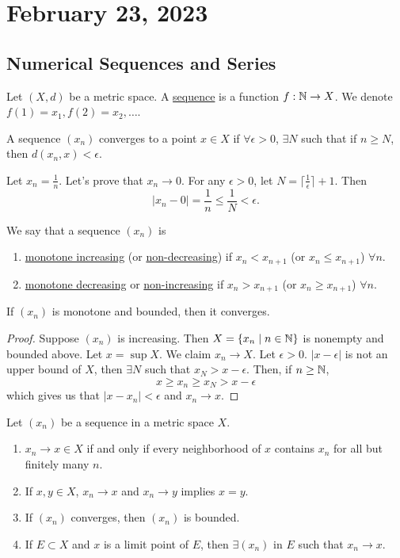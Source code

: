 \section{February 23, 2023}
\subsection{Numerical Sequences and Series}
\begin{definition}[Sequence]
    Let $(X, d)$ be a metric space. A \ul{sequence} is a function $f:\mathbb N\to X$. We denote $f(1) = x_1, f(2) = x_2, \dots$.
\end{definition}
\begin{definition}[Convergence]
    A sequence $(x_n)$ converges to a point $x\in X$ if $\forall \epsilon > 0$, $\exists N$ such that if $n\geq N$, then $d(x_n, x) < \epsilon$.
\end{definition}
\begin{example}
    Let $x_n = \frac{1}{n}$. Let's prove that $x_n\to 0$. For any $\epsilon > 0$, let $N = \lceil \frac{1}{\epsilon}\rceil + 1$. Then
    \[|x_n - 0| = \frac{1}{n}\leq \frac{1}{N} < \epsilon.\]
\end{example}
\begin{definition}
    We say that a sequence $(x_n)$ is
    \begin{enumerate}[(1)]
        \item \ul{monotone increasing} (or \ul{non-decreasing}) if $x_n < x_{n+1}$ (or $x_n \leq x_{n+1}$) $\forall n$.
        \item \ul{monotone decreasing} {or \ul{non-increasing}} if $x_n > x_{n+1}$ (or $x_n\geq x_{n+1}$) $\forall n$.
    \end{enumerate}
\end{definition}
\begin{theorem}
    If $(x_n)$ is monotone and bounded, then it converges.
\end{theorem}
\begin{proof}
    Suppose $(x_n)$ is increasing. Then $X = \left\{ x_n\mid n\in\mathbb N \right\}$ is nonempty and bounded above. Let $x = \sup X$. We claim $x_n\to X$. Let $\epsilon > 0$. $|x - \epsilon|$ is not an upper bound of $X$, then $\exists N$ such that $x_N > x - \epsilon$. Then, if $n\geq \mathbb N$,
    \[x\geq x_n \geq x_N > x-\epsilon\]
    which gives us that $|x - x_n| < \epsilon$ and $x_n\to x$.
\end{proof}
\begin{theorem}
    Let $(x_n)$ be a sequence in a metric space $X$.
    \begin{enumerate}[(1)]
        \item $x_n\to x\in X$ if and only if every neighborhood of $x$ contains $x_n$ for all but finitely many $n$.
        \item If $x, y\in X$, $x_n\to x$ and $x_n\to y$ implies $x = y$.
        \item If $(x_n)$ converges, then $(x_n)$ is bounded.
        \item If $E\subset X$ and $x$ is a limit point of $E$, then $\exists (x_n)$ in $E$ such that $x_n\to x$.
    \end{enumerate}
\end{theorem}
